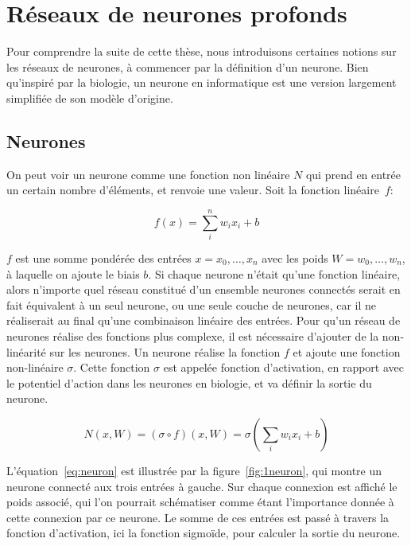 \section{Réseaux de neurones profonds}
\label{sec:stateoftheartNN}

Pour comprendre la suite de cette thèse, nous introduisons certaines notions sur les réseaux de neurones, à commencer par la définition d’un neurone.
Bien qu'inspiré par la biologie, un neurone en informatique est une version largement simplifiée de son modèle d'origine.

\subsection{Neurones}

On peut voir un neurone comme une fonction non linéaire $N$ qui prend en entrée un certain nombre d'éléments, et renvoie une valeur.
Soit la fonction linéaire~$f$:

\begin{equation}
f(x) = \sum_i^n w_i x_i + b
\label{eq:weightsum}
\end{equation}

$f$ est une somme pondérée des entrées $x = { x_0, … , x_n }$ avec les poids $W = { w_0, … , w_n }$, à laquelle on ajoute le biais $b$.
Si chaque neurone n'était qu'une fonction linéaire, alors n'importe quel réseau constitué d'un ensemble neurones connectés serait en fait équivalent à un seul neurone, ou une seule couche de neurones, car il ne réaliserait au final qu'une combinaison linéaire des entrées.
Pour qu'un réseau de neurones réalise des fonctions plus complexe, il est nécessaire d'ajouter de la non-linéarité sur les neurones.
Un neurone réalise la fonction $f$ et ajoute une fonction non-linéaire $\sigma$.
Cette fonction $\sigma$ est appelée fonction d'activation, en rapport avec le potentiel d'action dans les neurones en biologie, et va définir la sortie du neurone.

\begin{equation}
N(x, W) = (\sigma \circ f) (x, W) = \sigma(\sum_i w_i x_i + b)
\label{eq:neuron}
\end{equation}

L'équation~\ref{eq:neuron} est illustrée par la figure~\ref{fig:1neuron}, qui montre un neurone connecté aux trois entrées à gauche.
Sur chaque connexion est affiché le poids associé, qui l'on pourrait schématiser comme étant l'importance donnée à cette connexion par ce neurone.
Le somme de ces entrées est passé à travers la fonction d’activation, ici la fonction sigmoïde, pour calculer la sortie du neurone.

